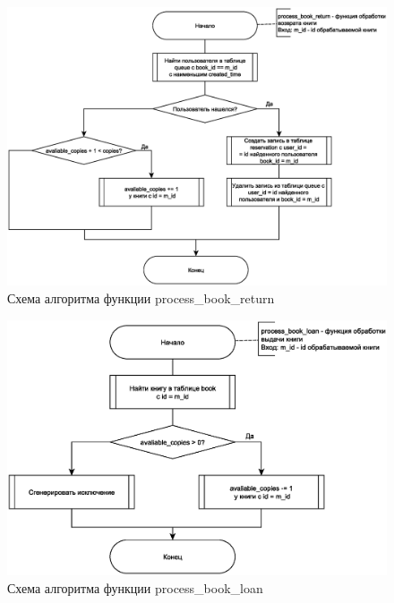 \begin{figure}[H]
	\centering
	\includegraphics[scale=0.5]{img/func_1.eps}
	\caption{Схема алгоритма функции process\_book\_return}
	\label{fig:func_1}
\end{figure}

\begin{figure}[H]
	\centering
	\includegraphics[scale=0.5]{img/func_2.eps}
	\caption{Схема алгоритма функции process\_book\_loan}
	\label{fig:func_2}
\end{figure}

